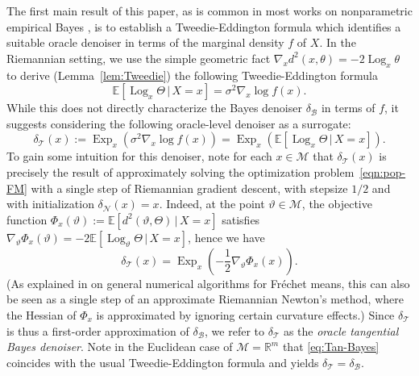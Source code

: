\documentclass[preprint]{imsart}
\theoremstyle{plain}
\theoremstyle{definition}
\newcommand{\Rbb}{\mathbb{R}}
\newcommand{\Ebb}{\mathbb{E}}
\newcommand{\Mcal}{\mathcal{M}}
\newcommand{\B}{\mathcal{B}}
\newcommand{\N}{\mathcal{N}}
\newcommand{\T}{\mathcal{T}}
\DeclareMathOperator{\Log}{Log}
\DeclareMathOperator{\Exp}{Exp}
\begin{document}
    The first main result of this paper, as is common in most works on nonparametric empirical Bayes \cite{dyson1926method, Robbins1956, IgnatiadisSen}, is to establish a Tweedie-Eddington formula which identifies a suitable oracle denoiser in terms of the marginal density $f$ of $X$.
    In the Riemannian setting, we use the simple geometric fact $\nabla_xd^2(x,\theta) = -2\Log_x\theta$ to derive (Lemma~\ref{lem:Tweedie}) the following Tweedie-Eddington formula
    \begin{equation}\label{eqn:Tweedie}
        \Ebb[\Log_{x}\Theta\,|\,X=x] = \sigma^{2}\nabla_{x}\log f(x).
    \end{equation}
    While this does not directly characterize the Bayes denoiser $\delta_{\B}$ in terms of $f$, it suggests considering the following oracle-level denoiser as a surrogate:
    \begin{equation}\label{eq:Tan-Bayes}
        \delta_{\T}(x) :=\Exp_x\left(\sigma^2 \nabla_x \log f(x)\right) =  \Exp_x\left(\Ebb[\Log_x\Theta\,|\,X=x]\right).
    \end{equation}
    To gain some intuition for this denoiser, note for each $x\in\Mcal$ that $\delta_{\T}(x)$ is precisely the result of approximately solving the optimization problem~\eqref{eqn:pop-FM} with a single step of Riemannian gradient descent, with stepsize $1/2$ and with initialization $\delta_{\N}(x) =x$.
    Indeed, at the point $\vartheta\in\Mcal$, the objective function $\Phi_x(\vartheta):=\Ebb[d^2(\vartheta,\Theta)\,|\,X=x]$ satisfies $\nabla_\vartheta\Phi_x(\vartheta) = -2\Ebb[\Log_{\vartheta}\Theta\,|\,X=x]$, hence we have
    \begin{equation}\label{eq:Tan-Bayes-GD}
        \delta_{\T}(x) = \Exp_x\left(-\frac{1}{2}\nabla_{\vartheta}\Phi_x(x)\right).
    \end{equation}
    (As explained in \cite[Section~4.6]{PennecRiemNorm} on general numerical algorithms for Fr\'echet means, this can also be seen as a single step of an approximate Riemannian Newton's method, where the Hessian of $\Phi_x$ is approximated by ignoring certain curvature effects.)
    Since $\delta_{\T}$ is thus a first-order approximation of $\delta_{\B}$, we refer to $\delta_{\T}$ as the \textit{oracle tangential Bayes denoiser}.
    Note in the Euclidean case of $\Mcal=\Rbb^m$ that \eqref{eq:Tan-Bayes} coincides with the usual Tweedie-Eddington formula and yields $\delta_{\T} = \delta_{\B}$.
\end{document}
